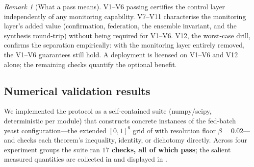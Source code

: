\documentclass[11pt,a4paper,twocolumn]{article}
\theoremstyle{thmstyle}
\theoremstyle{definition}
\theoremstyle{remark}
\newtheorem{remark}[theorem]{Remark}
\newcommand{\floor}{\beta}
\begin{document}
\begin{remark}[What a pass means]
\label{rem:pass}
V1--V6 passing certifies the control layer independently of any monitoring
capability. V7--V11 characterise the monitoring layer's added value
(confirmation, federation, the ensemble invariant, and the synthesis
round-trip) without being required for V1--V6. V12, the worst-case drill,
confirms the separation empirically: with the monitoring layer entirely
removed, the V1--V6 guarantees still hold. A deployment is licensed on
V1--V6 and V12 alone; the remaining checks quantify the optional benefit.
\end{remark}

\subsection{Numerical validation results}
\label{sec:valresults}

We implemented the protocol as a self-contained suite (numpy/scipy,
deterministic per module) that constructs concrete instances of the
fed-batch yeast configuration---the extended $[0,1]^6$ grid of
 with resolution floor $\floor=0.02$---and checks
each theorem's inequality, identity, or dichotomy directly. Across four
experiment groups the suite ran \textbf{$17$ checks, all of which pass};
the salient measured quantities are collected in
 and displayed in
.
\end{document}
